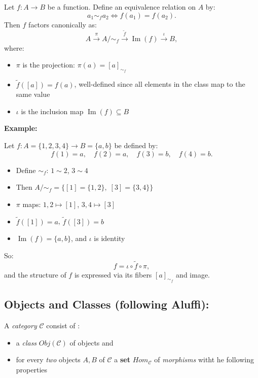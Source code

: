 \documentclass[10pt]{article}
\theoremstyle{plain}
\theoremstyle{definition}
\begin{document}
Let \( f: A \to B \) be a function. Define an equivalence relation on \( A \) by:
\[
a_1 \sim_f a_2 \iff f(a_1) = f(a_2).
\]
Then \( f \) factors canonically as:
\[
A \xrightarrow{\pi} A/{\sim_f} \xrightarrow{\widetilde{f}} \operatorname{Im}(f) \xrightarrow{\iota} B,
\]
where:
\begin{itemize}
	\item \( \pi \) is the projection: \( \pi(a) = [a]_{\sim_f} \)
	\item \( \widetilde{f}([a]) = f(a) \), well-defined since all elements in the class map to the same value
	\item \( \iota \) is the inclusion map \( \operatorname{Im}(f) \subseteq B \)
\end{itemize}

\bigskip

\textbf{Example:}

Let \( f: A = \{1,2,3,4\} \to B = \{a,b\} \) be defined by:
\[
f(1) = a, \quad f(2) = a, \quad f(3) = b, \quad f(4) = b.
\]

\begin{itemize}
	\item Define \( \sim_f \): \( 1 \sim 2 \), \( 3 \sim 4 \)
	\item Then \( A/{\sim_f} = \{ [1] = \{1,2\},\; [3] = \{3,4\} \} \)
	\item \( \pi \) maps: \( 1,2 \mapsto [1] \), \( 3,4 \mapsto [3] \)
	\item \( \widetilde{f}([1]) = a \), \( \widetilde{f}([3]) = b \)
	\item \( \operatorname{Im}(f) = \{a,b\} \), and \( \iota \) is identity
\end{itemize}

\bigskip

So:
\[
f = \iota \circ \widetilde{f} \circ \pi,
\]
and the structure of \( f \) is expressed via its fibers \( [a]_{\sim_f} \) and image.


\subsection*{Objects and Classes (following Aluffi):}

A \textit{category} $\mathcal{C}$ consist of : 
\begin{itemize}
	\item a \textit{class} $Obj(\mathcal{C})$ of objects and
\item for every \textit{two} objects $A,B$ of $\mathcal{C}$ a \textbf{set} $Hom_\mathcal{C}$ of \textit{morphisms} witht he following properties
\end{itemize}
\end{document}
